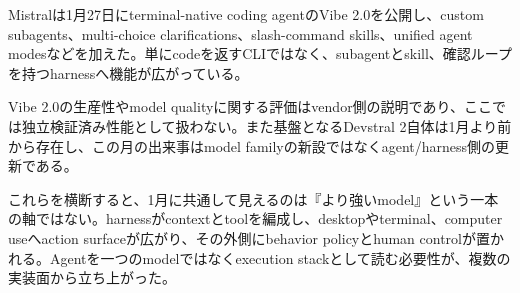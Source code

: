 Mistralは1月27日にterminal-native coding agentのVibe 2.0を公開し、custom subagents、multi-choice clarifications、slash-command skills、unified agent modesなどを加えた。単にcodeを返すCLIではなく、subagentとskill、確認ループを持つharnessへ機能が広がっている。\autocite{src-d8b7c1c36830}


\begin{claimboundary}
Vibe 2.0の生産性やmodel qualityに関する評価はvendor側の説明であり、ここでは独立検証済み性能として扱わない。また基盤となるDevstral 2自体は1月より前から存在し、この月の出来事はmodel familyの新設ではなくagent/harness側の更新である。\autocite{src-d8b7c1c36830}
\end{claimboundary}

これらを横断すると、1月に共通して見えるのは『より強いmodel』という一本の軸ではない。harnessがcontextとtoolを編成し、desktopやterminal、computer useへaction surfaceが広がり、その外側にbehavior policyとhuman controlが置かれる。Agentを一つのmodelではなくexecution stackとして読む必要性が、複数の実装面から立ち上がった。\autocite{src-a24fd97eb3d0,src-ae10eb4597fe,src-d8b7c1c36830,src-f6aa679babd7}
